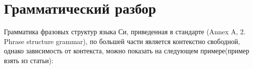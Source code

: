 












\clearpage
\section{Грамматический разбор}
\label{pass:parsing}




Грамматика фразовых структур языка Си, приведенная в стандарте\cite{c99_std} (Annex A, 2. Phrase structure grammar),
по большей части является контекстно свободной, однако зависимость от контекста, можно показать на следующем примере(пример взять из статьи\cite{eli_c_cs}):

